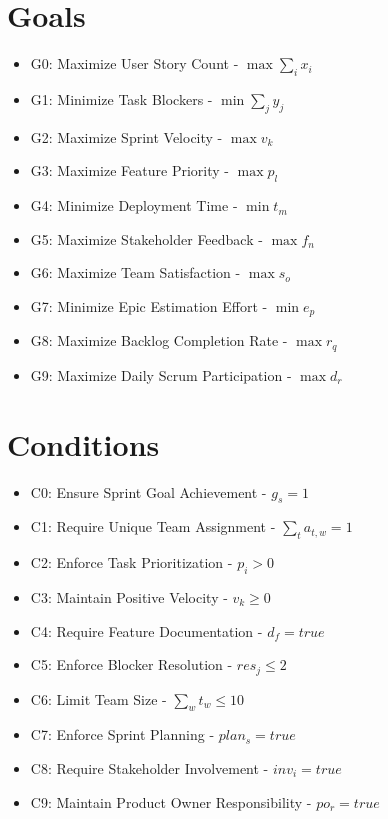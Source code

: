 \documentclass{article}
\begin{document}
\section{Goals}
\begin{itemize}
    \item G0: Maximize User Story Count - $\max \sum_{i} x_i$
    \item G1: Minimize Task Blockers - $\min \sum_{j} y_j$
    \item G2: Maximize Sprint Velocity - $\max v_k$
    \item G3: Maximize Feature Priority - $\max p_l$
    \item G4: Minimize Deployment Time - $\min t_m$
    \item G5: Maximize Stakeholder Feedback - $\max f_n$
    \item G6: Maximize Team Satisfaction - $\max s_o$
    \item G7: Minimize Epic Estimation Effort - $\min e_p$
    \item G8: Maximize Backlog Completion Rate - $\max r_q$
    \item G9: Maximize Daily Scrum Participation - $\max d_r$
\end{itemize}

\section{Conditions}
\begin{itemize}
    \item C0: Ensure Sprint Goal Achievement - $g_s = 1$
    \item C1: Require Unique Team Assignment - $\sum_{t} a_{t,w} = 1$
    \item C2: Enforce Task Prioritization - $p_i > 0$
    \item C3: Maintain Positive Velocity - $v_k \geq 0$
    \item C4: Require Feature Documentation - $d_f = true$
    \item C5: Enforce Blocker Resolution - $res_j \leq 2$
    \item C6: Limit Team Size - $\sum_{w} t_w \leq 10$
    \item C7: Enforce Sprint Planning - $plan_s = true$
    \item C8: Require Stakeholder Involvement - $inv_i = true$
    \item C9: Maintain Product Owner Responsibility - $po_r = true$
\end{itemize}
\end{document}
